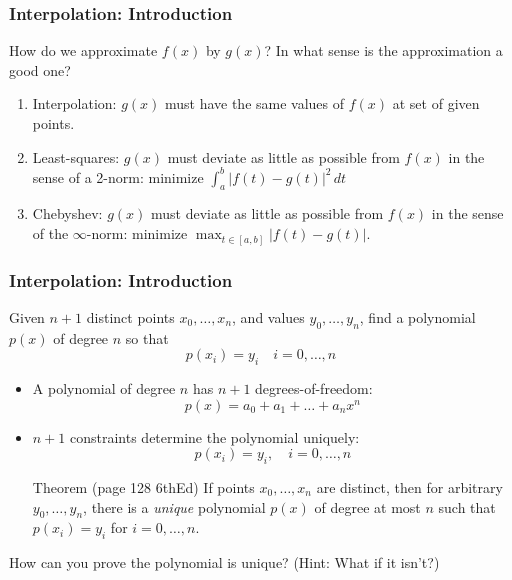 \documentclass[10pt]{beamer}
\begin{document}
\begin{frame}
\frametitle{Interpolation: Introduction}
How do we approximate $f(x)$ by $g(x)$?  In what sense is the
approximation a good one? 
\begin{enumerate}
  \item Interpolation: $g(x)$ must have the same values of $f(x)$ at set
of given points.
  \item Least-squares: $g(x)$ must deviate as little as possible from
$f(x)$ in the sense of a 2-norm:  minimize $\int_{a}^b |f(t)-g(t)|^2\,dt$
  \item Chebyshev: $g(x)$ must deviate as little as possible from $f(x)$
in the sense of the $\infty$-norm: minimize $\max_{t\in[a,b]}
|f(t)-g(t)|$.
\end{enumerate}
\end{frame}
\begin{frame}
\frametitle{Interpolation: Introduction}
  \begin{block}{}
    Given $n+1$ distinct points $x_0,\dots,x_n$, and values
$y_0,\dots,y_n$, find a polynomial $p(x)$ of degree $n$ so that
  \begin{equation*}
    p(x_i) = y_i\quad i=0,\dots,n
\end{equation*}
  \end{block}
\begin{itemize}
  \item A polynomial of degree $n$ has $n+1$ degrees-of-freedom:
\begin{equation*}
  p(x) = a_0 + a_1 + \dots + a_n x^n
\end{equation*}
\item $n+1$ constraints determine the polynomial uniquely:
\begin{equation*}
  p(x_i) = y_i, \quad i=0,\dots,n
\end{equation*}
\begin{block}{Theorem (page 128 6thEd)}
  If points $x_0,\dots,x_n$ are distinct, then for arbitrary $y_0,\dots,y_n$,
there is a \emph{unique} polynomial $p(x)$ of degree at most $n$ such that
$p(x_i)=y_i$ for $i=0,\dots,n$.
\end{block}
\end{itemize}
\begin{alertblock}{}
How can you prove the polynomial is unique?  (Hint: What if it isn't?)
\end{alertblock}
\end{frame}
\end{document}
